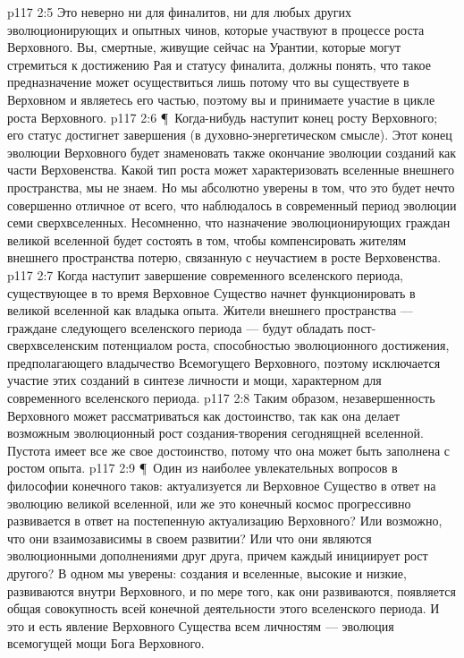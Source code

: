 \vs p117 2:5 Это неверно ни для финалитов, ни для любых других эволюционирующих и опытных чинов, которые участвуют в процессе роста Верховного. Вы, смертные, живущие сейчас на Урантии, которые могут стремиться к достижению Рая и статусу финалита, должны понять, что такое предназначение может осуществиться лишь потому что вы существуете в Верховном и являетесь его частью, поэтому вы и принимаете участие в цикле роста Верховного.
\vs p117 2:6 \P\ Когда\hyp{}нибудь наступит конец росту Верховного; его статус достигнет завершения (в духовно\hyp{}энергетическом смысле). Этот конец эволюции Верховного будет знаменовать также окончание эволюции созданий как части Верховенства. Какой тип роста может характеризовать вселенные внешнего пространства, мы не знаем. Но мы абсолютно уверены в том, что это будет нечто совершенно отличное от всего, что наблюдалось в современный период эволюции семи сверхвселенных. Несомненно, что назначение эволюционирующих граждан великой вселенной будет состоять в том, чтобы компенсировать жителям внешнего пространства потерю, связанную с неучастием в росте Верховенства.
\vs p117 2:7 Когда наступит завершение современного вселенского периода, существующее в то время Верховное Существо начнет функционировать в великой вселенной как владыка опыта. Жители внешнего пространства --- граждане следующего вселенского периода --- будут обладать пост\hyp{}сверхвселенским потенциалом роста, способностью эволюционного достижения, предполагающего владычество Всемогущего Верховного, поэтому исключается участие этих созданий в синтезе личности и мощи, характерном для современного вселенского периода.
\vs p117 2:8 Таким образом, незавершенность Верховного может рассматриваться как достоинство, так как она делает возможным эволюционный рост создания\hyp{}творения сегоднящней вселенной. Пустота имеет все же свое достоинство, потому что она может быть заполнена с ростом опыта.
\vs p117 2:9 \P\ Один из наиболее увлекательных вопросов в философии конечного таков: актуализуется ли Верховное Существо в ответ на эволюцию великой вселенной, или же это конечный космос прогрессивно развивается в ответ на постепенную актуализацию Верховного? Или возможно, что они взаимозависимы в своем развитии? Или что они являются эволюционными дополнениями друг друга, причем каждый инициирует рост другого? В одном мы уверены: создания и вселенные, высокие и низкие, развиваются внутри Верховного, и по мере того, как они развиваются, появляется общая совокупность всей конечной деятельности этого вселенского периода. И это и есть явление Верховного Существа всем личностям --- эволюция всемогущей мощи Бога Верховного.
